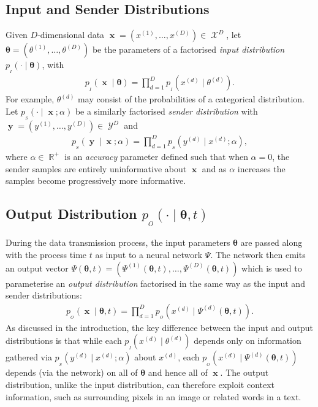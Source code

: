 \documentclass[11pt,table]{article}
\DeclareMathOperator{\x}{\mathbf{x}}
\DeclareMathOperator{\X}{\mathcal{X}}
\DeclareMathOperator{\y}{\mathbf{y}}
\DeclareMathOperator{\Y}{\mathcal{Y}}
\DeclareMathOperator{\R}{\mathbb{R}}
\newcommand{\didx}[2]{#1^{(#2)}}
\renewcommand{\vec}[1]{\boldsymbol{#1}}
\newcommand{\pars}{\theta}
\newcommand{\parsn}{\vec{\pars}}
\newcommand{\0}[1]{\constvec{0}{#1}}
\newcommand{\1}[1]{\constvec{1}{#1}}
\newcommand{\parsdd}[1]{\didx{\pars}{#1}}
\def\net{\Psi\xspace}
\newcommand{\sender}[2]{p_{_S}\left(#1 \mid #2\right)}
\newcommand{\out}{p_{_O}}
\newcommand{\inp}{p_{_I}}
\begin{document}
\subsection{Input and Sender Distributions}
Given $D$-dimensional data $\x = \left(\didx{x}{1},\dots,\didx{x}{D}\right) \in \X^D$, let $\parsn = \left(\parsdd{1},\dots,\parsdd{D}\right)$ be the parameters of a factorised \emph{input distribution} $\inp(\cdot \mid \parsn)$, with
\begin{align}
\inp(\x \mid \parsn) = \prod_{d=1}^D \inp(\didx{x}{d} \mid \parsdd{d}).
\end{align}
For example, $\parsdd{d}$ may consist of the probabilities of a categorical distribution. 
Let $\sender{\cdot}{\x;\alpha}$ be a similarly factorised \emph{sender distribution} with $\y =\left(\didx{y}{1},\dots,\didx{y}{D}\right) \in \Y^D$ and
\begin{align}
\sender{\y}{\x;\alpha} = \prod_{d=1}^D \sender{\didx{y}{d}}{\didx{x}{d}; \alpha},
\end{align}
where $\alpha \in \R^+$ is an \emph{accuracy} parameter defined such that when $\alpha=0$, the sender samples are entirely uninformative about $\x$ and as $\alpha$ increases the samples become progressively more informative.
\subsection{Output Distribution \texorpdfstring{$\out(\cdot \mid \parsn, t)$}{}}
During the data transmission process, the input parameters $\parsn$ are passed along with the process time $t$ as input to a neural network $\net$.
The network then emits an output vector $\net(\parsn, t) = \left(\didx{\net}{1}(\parsn, t),\dots,\didx{\net}{D}(\parsn, t)\right)$ which is used to parameterise an \textit{output distribution} factorised in the same way as the input and sender distributions:
\begin{align}
\out(\x \mid \parsn, t) = \prod_{d=1}^D \out(\didx{x}{d} \mid \didx{\net}{d}(\parsn, t)).
\end{align}
As discussed in the introduction, the key difference between the input and output distributions is that while each $\inp(\didx{x}{d} \mid \parsdd{d})$ depends only on information gathered via $\sender{\didx{y}{d}}{\didx{x}{d};\alpha}$ about $\didx{x}{d}$, each $\out(\didx{x}{d} \mid \didx{\net}{d}(\parsn, t))$ depends (via the network) on all of $\parsn$ and hence all of $\x$.
The output distribution, unlike the input distribution, can therefore exploit context information, such as surrounding pixels in an image or related words in a text.
\end{document}
